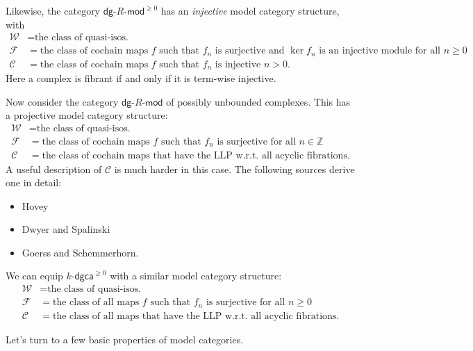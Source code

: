 \documentclass[10pt,letterpaper,cm]{nupset}
\theoremstyle{definition}
\theoremstyle{theorem}
\theoremstyle{remark}
\newcommand{\Z}{\mathbb Z}
\newcommand{\1}{\mathbb{1}}
\newcommand{\cf}{\mathscr{C}}
\newcommand{\f}{\mathscr{F}}
\newcommand{\w}{\mathscr{W}}
\newcommand{\dgca}{\mathsf{dgca}}
\newcommand{\dg}{\mathsf{dg}}
\newcommand{\0}{\vec 0}
\newcommand{\bi}{\begin{itemize}}
\newcommand{\ei}{\end{itemize}}
\begin{document}
\medskip

Likewise, the category $\dg{\text{-}}R{\text{-}}\mathsf{mod}^{\geq 0}$ has an \textit{injective} model category structure, with
\begin{align*}
\w & = \text{the class of quasi-isos.}
\\ \f & = \text{the class of cochain maps $f$ such that $f_n$ is surjective and $\ker{f_n}$ is an injective module for all $n\geq 0$}
\\ \cf & =  \text{the class of cochain maps $f$ such that $f_n$ is injective $n > 0$}
. 
\end{align*} 
Here a complex is fibrant if and only if it is term-wise injective. 

\medskip

Now consider the category $\dg{\text{-}}R{\text{-}}\mathsf{mod}$ of possibly unbounded complexes. This has a projective model category structure:
\begin{align*}
\w & = \text{the class of quasi-isos.}
\\ \f & = \text{the class of cochain maps $f$ such that $f_n$ is surjective for all $n\in \Z$}
\\ \cf & =  \text{the class of cochain maps that have the LLP w.r.t.\ all acyclic fibrations}
. 
\end{align*}
A useful description of $\cf$ is much harder in this case. The following sources derive one in detail:
\bi
\item Hovey
\item Dwyer and Spalinski
\item Goerss and Schemmerhorn.
\ei

We can equip $k\text{-}\dgca^{\geq 0}$ with a similar model category structure:
\begin{align*}
\w & = \text{the class of quasi-isos.}
\\ \f & = \text{the class of all maps $f$ such that $f_n$ is surjective for all $n\geq 0$}
\\ \cf & =  \text{the class of all maps that have the LLP w.r.t.\ all acyclic fibrations}
. 
\end{align*}

\medskip

Let's turn to a few basic properties of model categories.
\end{document}
